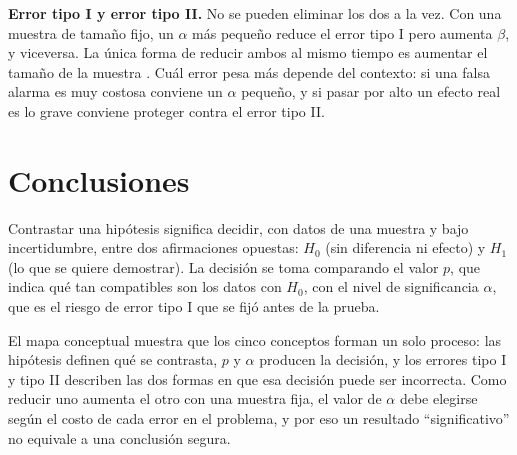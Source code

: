 \documentclass[11pt,letterpaper]{article}
\begin{document}
\textbf{Error tipo I y error tipo II.} No se pueden eliminar los dos a la vez. Con una muestra de tamaño fijo, un $\alpha$ más pequeño reduce el error tipo I pero aumenta $\beta$, y viceversa. La única forma de reducir ambos al mismo tiempo es aumentar el tamaño de la muestra \parencite{tecnm2026_documento_fuente}. Cuál error pesa más depende del contexto: si una falsa alarma es muy costosa conviene un $\alpha$ pequeño, y si pasar por alto un efecto real es lo grave conviene proteger contra el error tipo II.

\section{Conclusiones}

Contrastar una hipótesis significa decidir, con datos de una muestra y bajo incertidumbre, entre dos afirmaciones opuestas: $H_0$ (sin diferencia ni efecto) y $H_1$ (lo que se quiere demostrar). La decisión se toma comparando el valor $p$, que indica qué tan compatibles son los datos con $H_0$, con el nivel de significancia $\alpha$, que es el riesgo de error tipo I que se fijó antes de la prueba.

El mapa conceptual muestra que los cinco conceptos forman un solo proceso: las hipótesis definen qué se contrasta, $p$ y $\alpha$ producen la decisión, y los errores tipo I y tipo II describen las dos formas en que esa decisión puede ser incorrecta. Como reducir uno aumenta el otro con una muestra fija, el valor de $\alpha$ debe elegirse según el costo de cada error en el problema, y por eso un resultado ``significativo'' no equivale a una conclusión segura.

\end{document}
